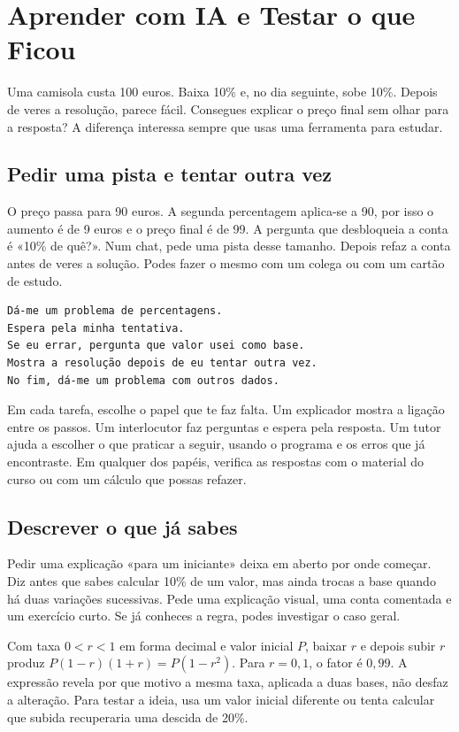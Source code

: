 \chapter{Aprender com IA e Testar o que Ficou}
\label{ch:aprender}

Uma camisola custa 100 euros. Baixa 10\% e, no dia seguinte, sobe 10\%. Depois de veres a resolução, parece fácil. Consegues explicar o preço final sem olhar para a resposta? A diferença interessa sempre que usas uma ferramenta para estudar.

\section{Pedir uma pista e tentar outra vez}

O preço passa para 90 euros. A segunda percentagem aplica-se a 90, por isso o aumento é de 9 euros e o preço final é de 99. A pergunta que desbloqueia a conta é «10\% de quê?». Num chat, pede uma pista desse tamanho. Depois refaz a conta antes de veres a solução. Podes fazer o mesmo com um colega ou com um cartão de estudo.

\begin{lstlisting}
Dá-me um problema de percentagens.
Espera pela minha tentativa.
Se eu errar, pergunta que valor usei como base.
Mostra a resolução depois de eu tentar outra vez.
No fim, dá-me um problema com outros dados.
\end{lstlisting}

Em cada tarefa, escolhe o papel que te faz falta. Um explicador mostra a ligação entre os passos. Um interlocutor faz perguntas e espera pela resposta. Um tutor ajuda a escolher o que praticar a seguir, usando o programa e os erros que já encontraste. Em qualquer dos papéis, verifica as respostas com o material do curso ou com um cálculo que possas refazer.

\section{Descrever o que já sabes}

Pedir uma explicação «para um iniciante» deixa em aberto por onde começar. Diz antes que sabes calcular 10\% de um valor, mas ainda trocas a base quando há duas variações sucessivas. Pede uma explicação visual, uma conta comentada e um exercício curto. Se já conheces a regra, podes investigar o caso geral.

Com taxa $0<r<1$ em forma decimal e valor inicial $P$, baixar $r$ e depois subir $r$ produz $P(1-r)(1+r)=P(1-r^2)$. Para $r=0{,}1$, o fator é $0{,}99$. A expressão revela por que motivo a mesma taxa, aplicada a duas bases, não desfaz a alteração. Para testar a ideia, usa um valor inicial diferente ou tenta calcular que subida recuperaria uma descida de 20\%.


